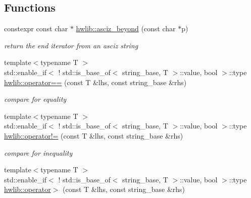 \subsection*{Functions}
\begin{DoxyCompactItemize}
\item 
\mbox{\label{namespacehwlib_ac2e019795d659ed910859234b24a55ac}} 
constexpr const char $\ast$ \hyperlink{namespacehwlib_ac2e019795d659ed910859234b24a55ac}{hwlib\+::asciz\+\_\+beyond} (const char $\ast$p)
\begin{DoxyCompactList}\small\item\em return the end iterator from an asciz string \end{DoxyCompactList}\item 
\mbox{\label{namespacehwlib_a5c3610a4a7cf0e2909eb00c77c9fa5f0}} 
{\footnotesize template$<$typename T $>$ }\\std\+::enable\+\_\+if$<$ ! std\+::is\+\_\+base\+\_\+of$<$ string\+\_\+base, T $>$\+::value, bool $>$\+::type \hyperlink{namespacehwlib_a5c3610a4a7cf0e2909eb00c77c9fa5f0}{hwlib\+::operator==} (const T \&lhs, const string\+\_\+base \&rhs)
\begin{DoxyCompactList}\small\item\em compare for equality \end{DoxyCompactList}\item 
\mbox{\label{namespacehwlib_a20a6e09156c0627a1d75183ac6b1abea}} 
{\footnotesize template$<$typename T $>$ }\\std\+::enable\+\_\+if$<$ ! std\+::is\+\_\+base\+\_\+of$<$ string\+\_\+base, T $>$\+::value, bool $>$\+::type \hyperlink{namespacehwlib_a20a6e09156c0627a1d75183ac6b1abea}{hwlib\+::operator!=} (const T \&lhs, const string\+\_\+base \&rhs)
\begin{DoxyCompactList}\small\item\em compare for inequality \end{DoxyCompactList}\item 
\mbox{\label{namespacehwlib_a1076d3be6e5022278a0514b886901dde}} 
{\footnotesize template$<$typename T $>$ }\\std\+::enable\+\_\+if$<$ ! std\+::is\+\_\+base\+\_\+of$<$ string\+\_\+base, T $>$\+::value, bool $>$\+::type \hyperlink{namespacehwlib_a1076d3be6e5022278a0514b886901dde}{hwlib\+::operator$>$} (const T \&lhs, const string\+\_\+base \&rhs)

\end{DoxyCompactItemize}
